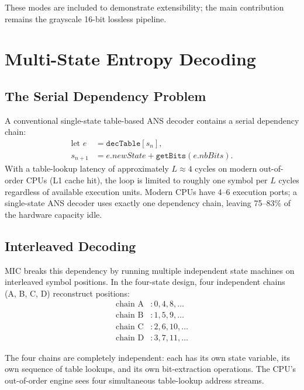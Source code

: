 \documentclass[journal]{IEEEtran}
\begin{document}
These modes are included to demonstrate extensibility; the main contribution
remains the grayscale 16-bit lossless pipeline.

\section{Multi-State Entropy Decoding}
\label{sec:multistate}

\subsection{The Serial Dependency Problem}

A conventional single-state table-based ANS decoder contains a serial
dependency chain:
\begin{equation}
\begin{aligned}
  \text{let } e &= \texttt{decTable}[s_n], \\
  s_{n+1} &= e.\textit{newState} + \texttt{getBits}(e.\textit{nbBits}).
\end{aligned}
\end{equation}
With a table-lookup latency of approximately $L \approx 4$ cycles on modern
out-of-order CPUs (L1 cache hit), the loop is limited to roughly one symbol per
$L$ cycles regardless of available execution units. Modern CPUs have 4--6
execution ports; a single-state ANS decoder uses exactly one dependency chain,
leaving 75--83\% of the hardware capacity idle.

\subsection{Interleaved Decoding}

MIC breaks this dependency by running multiple independent state machines on
interleaved symbol positions. In the four-state design, four independent chains
(A, B, C, D) reconstruct positions:
\begin{align*}
  \text{chain A}&: 0, 4, 8, \ldots \\
  \text{chain B}&: 1, 5, 9, \ldots \\
  \text{chain C}&: 2, 6, 10, \ldots \\
  \text{chain D}&: 3, 7, 11, \ldots
\end{align*}

The four chains are completely independent: each has its own state variable, its
own sequence of table lookups, and its own bit-extraction operations. The CPU's
out-of-order engine sees four simultaneous table-lookup address streams.
\end{document}
